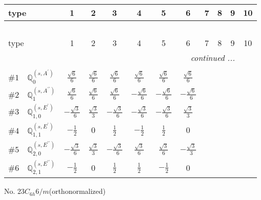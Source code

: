 \documentclass[fleqn,9pt,landscape]{jsarticle}
\begin{document}
\begin{center}
\renewcommand{\arraystretch}{1.3}
\begin{longtable}{lcccccccccc}
 \hline \hline
type & 1 & 2 & 3 & 4 & 5 & 6 & 7 & 8 & 9 & 10 \\ \hline \endfirsthead

\multicolumn{10}{l}{\tablename\ \thetable{}} \\
 \hline \hline
type & 1 & 2 & 3 & 4 & 5 & 6 & 7 & 8 & 9 & 10 \\ \hline \endhead

 \hline \hline
\multicolumn{10}{r}{\footnotesize\it continued ...} \\ \endfoot

 \hline \hline
\multicolumn{10}{r}{} \\ \endlastfoot

$ \#1\quad \mathbb{Q}_{0}^{(s,A^{\prime})} $ & $ \frac{\sqrt{6}}{6} $ & $ \frac{\sqrt{6}}{6} $ & $ \frac{\sqrt{6}}{6} $ & $ \frac{\sqrt{6}}{6} $ & $ \frac{\sqrt{6}}{6} $ & $ \frac{\sqrt{6}}{6} $ \\ \hline
$ \#2\quad \mathbb{Q}_{1}^{(s,A^{\prime\prime})} $ & $ \frac{\sqrt{6}}{6} $ & $ \frac{\sqrt{6}}{6} $ & $ \frac{\sqrt{6}}{6} $ & $ - \frac{\sqrt{6}}{6} $ & $ - \frac{\sqrt{6}}{6} $ & $ - \frac{\sqrt{6}}{6} $ \\ \hline
$ \#3\quad \mathbb{Q}_{1,0}^{(s,E^{\prime})} $ & $ - \frac{\sqrt{3}}{6} $ & $ \frac{\sqrt{3}}{3} $ & $ - \frac{\sqrt{3}}{6} $ & $ - \frac{\sqrt{3}}{6} $ & $ - \frac{\sqrt{3}}{6} $ & $ \frac{\sqrt{3}}{3} $ \\ \hline
$ \#4\quad \mathbb{Q}_{1,1}^{(s,E^{\prime})} $ & $ - \frac{1}{2} $ & $ 0 $ & $ \frac{1}{2} $ & $ - \frac{1}{2} $ & $ \frac{1}{2} $ & $ 0 $ \\ \hline
$ \#5\quad \mathbb{Q}_{2,0}^{(s,E^{\prime\prime})} $ & $ - \frac{\sqrt{3}}{6} $ & $ \frac{\sqrt{3}}{3} $ & $ - \frac{\sqrt{3}}{6} $ & $ \frac{\sqrt{3}}{6} $ & $ \frac{\sqrt{3}}{6} $ & $ - \frac{\sqrt{3}}{3} $ \\ \hline
$ \#6\quad \mathbb{Q}_{2,1}^{(s,E^{\prime\prime})} $ & $ - \frac{1}{2} $ & $ 0 $ & $ \frac{1}{2} $ & $ \frac{1}{2} $ & $ - \frac{1}{2} $ & $ 0 $ \\
\end{longtable}
\end{center}
\newpage
\begin{center}
\LARGE
No. 23\quad$C_{6h}$\quad$6/m$\quad[ hexagonal ] (orthonormalized)
\end{center}
\vspace{5mm}
\end{document}
